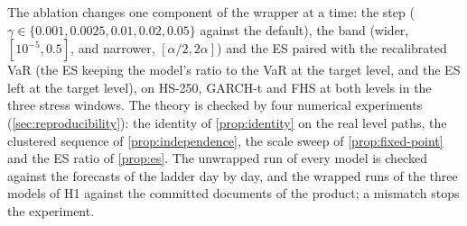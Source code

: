 The ablation changes one component of the wrapper at a time: the step ($\gamma \in \{0.001, 0.0025, 0.01, 0.02, 0.05\}$ against the default), the band (wider, $[10^{-5}, 0.5]$, and narrower, $[\alpha/2, 2\alpha]$) and the ES paired with the recalibrated VaR (the ES keeping the model's ratio to the VaR at the target level, and the ES left at the target level), on HS-250, GARCH-t and FHS at both levels in the three stress windows. The theory is checked by four numerical experiments (\cref{sec:reproducibility}): the identity of \cref{prop:identity} on the real level paths, the clustered sequence of \cref{prop:independence}, the scale sweep of \cref{prop:fixed-point} and the ES ratio of \cref{prop:es}. The unwrapped run of every model is checked against the forecasts of the ladder day by day, and the wrapped runs of the three models of H1 against the committed documents of the product; a mismatch stops the experiment.
